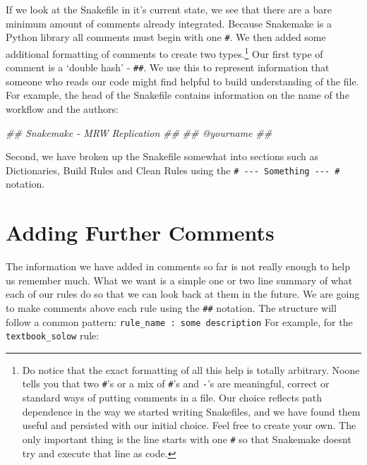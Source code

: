 \documentclass[]{book}
\newenvironment{Shaded}{\begin{snugshade}}{\end{snugshade}}
\newcommand{\CommentTok}[1]{\textcolor[rgb]{0.56,0.35,0.01}{\textit{{#1}}}}
\let\rmarkdownfootnote\footnote%
\def\footnote{\protect\rmarkdownfootnote}
\theoremstyle{definition}
\theoremstyle{definition}
\theoremstyle{definition}
\theoremstyle{remark}
\begin{document}
If we look at the Snakefile in it's current state, we see that there are
a bare minimum amount of comments already integrated. Because Snakemake
is a Python library all comments must begin with one \texttt{\#}. We
then added some additional formatting of comments to create two
types.\footnote{Do notice that the exact formatting of all this help is
  totally arbitrary. Noone tells you that two \texttt{\#}'s or a mix of
  \texttt{\#}'s and \texttt{-}'s are meaningful, correct or standard
  ways of putting comments in a file. Our choice reflects path
  dependence in the way we started writing Snakefiles, and we have found
  them useful and persisted with our initial choice. Feel free to create
  your own. The only important thing is the line starts with one
  \texttt{\#} so that Snakemake doesnt try and execute that line as
  code.} Our first type of comment is a `double hash' - \texttt{\#\#}.
We use this to represent information that someone who reads our code
might find helpful to build understanding of the file. For example, the
head of the Snakefile contains information on the name of the workflow
and the authors:

\begin{Shaded}
\begin{Highlighting}[]
\CommentTok{## Snakemake - MRW Replication}
\CommentTok{##}
\CommentTok{## @yourname}
\CommentTok{##}
\end{Highlighting}
\end{Shaded}

Second, we have broken up the Snakefile somewhat into sections such as
Dictionaries, Build Rules and Clean Rules using the
\texttt{\#\ -\/-\/-\ Something\ -\/-\/-\ \#} notation.

\section{Adding Further Comments}\label{adding-further-comments}

The information we have added in comments so far is not really enough to
help us remember much. What we want is a simple one or two line summary
of what each of our rules do so that we can look back at them in the
future. We are going to make comments above each rule using the
\texttt{\#\#} notation. The structure will follow a common pattern:
\texttt{rule\_name\ :\ some\ description} For example, for the
\texttt{textbook\_solow} rule:
\end{document}
